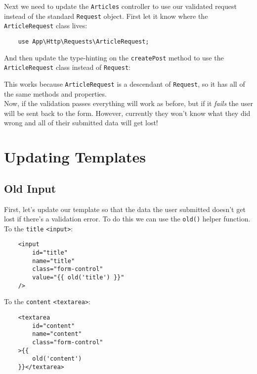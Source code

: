 
Next we need to  update the \texttt{Articles} controller to use our validated request instead of the standard \texttt{Request} object. First let it know where the \texttt{ArticleRequest} class lives:

\begin{verbatim}
    use App\Http\Requests\ArticleRequest;
\end{verbatim}

And then update the type-hinting on the \texttt{createPost} method to use the \texttt{ArticleRequest} class instead of \texttt{Request}:


This works because \texttt{ArticleRequest} is a descendant of \texttt{Request}, so it has all of the same methods and properties.
\\

Now, if the validation passes everything will work as before, but if it \textit{fails} the user will be sent back to the form. However, currently they won't know what they did wrong and all of their submitted data will get lost!


\section{Updating Templates}

\subsection{Old Input}

First, let's update our template so that the data the user submitted doesn't get lost if there's a validation error. To do this we can use the \texttt{old()} helper function.
\\

To the \texttt{title} \texttt{<input>}:

\begin{verbatim}
    <input
        id="title"
        name="title"
        class="form-control"
        value="{{ old('title') }}"
    />
\end{verbatim}

To the \texttt{content} \texttt{<textarea>}:

\begin{verbatim}
    <textarea
        id="content"
        name="content"
        class="form-control"
    >{{
        old('content')
    }}</textarea>
\end{verbatim}

